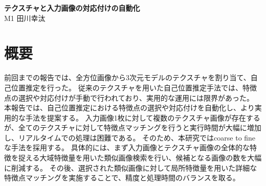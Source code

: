 \documentclass[]{jarticle}          %
\begin{document}

\vspace*{2ex}
\begin{center}
 {\Large \bf テクスチャと入力画像の対応付けの自動化}\\ %
 \vspace*{5mm}
 {\large M1 田川幸汰}%
\end{center}






\section{概要}
前回までの報告では、全方位画像から3次元モデルのテクスチャを割り当て、自己位置推定を行った。
従来のテクスチャを用いた自己位置推定手法では、特徴点の選択や対応付けが手動で行われており、実用的な運用には限界があった。
本報告では、自己位置推定における特徴点の選択や対応付けを自動化し、より実用的な手法を提案する。
入力画像1枚に対して複数のテクスチャ画像が存在するが、全てのテクスチャに対して特徴点マッチングを行うと実行時間が大幅に増加し、リアルタイムでの処理は困難である。
そのため、本研究ではcoarse to fineな手法を採用する。
具体的には、まず入力画像とテクスチャ画像の全体的な特徴を捉える大域特徴量を用いた類似画像検索を行い、候補となる画像の数を大幅に削減する。
その後、選択された類似画像に対して局所特徴量を用いた詳細な特徴点マッチングを実施することで、精度と処理時間のバランスを取る。
\end{document}
